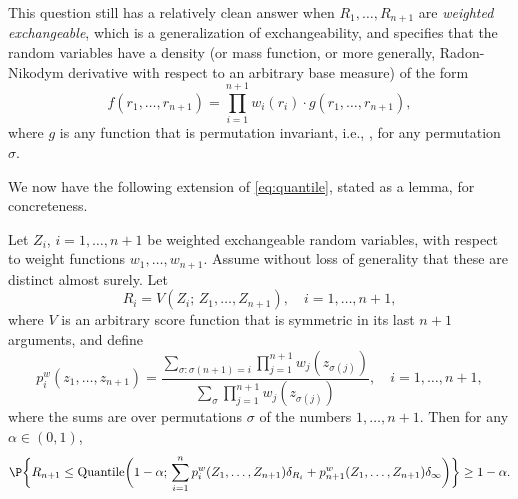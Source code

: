 \documentclass{article}
\begin{document}
This question still has a relatively clean answer when $R_1,\dots,R_{n+1}$ are
\emph{weighted exchangeable}, which is a generalization of exchangeability, and
specifies that the random variables have a density (or mass function, or more
generally, Radon-Nikodym derivative with respect to an arbitrary base measure)
of the form   
\begin{equation}
\label{eq:weighted_exch}
f(r_1,\dots,r_{n+1}) = \prod_{i=1}^{n+1} w_i(r_i) \cdot g(r_1,\dots,r_{n+1}),  
\end{equation}
where $g$ is any function that is permutation invariant, i.e.,
, for
any permutation $\sigma$.

We now have the following extension of \eqref{eq:quantile}, stated as a lemma,
for concreteness.  

\begin{lemma}
\label{lem:weighted_quant}
Let $Z_i$, $i=1,\dots,n+1$ be weighted exchangeable random variables, with
respect to weight functions $w_1,\dots,w_{n+1}$. Assume without loss of
generality that these are distinct almost surely. Let 
\[
R_i = V(Z_i; \, Z_1,\dots,Z_{n+1}), \quad i=1,\dots,n+1, 
\]
where $V$ is an arbitrary score function that is symmetric in its last $n+1$
arguments, and define
\begin{equation}
\label{eq:pw}
p^w_i(z_1,\dots,z_{n+1}) = 
\frac{\sum_{\sigma : \sigma(n+1)=i} \prod_{j=1}^{n+1} w_j(z_{\sigma(j)})}
{\sum_\sigma \prod_{j=1}^{n+1} w_j(z_{\sigma(j)})}, \quad i=1,\dots,n+1,   
\end{equation} 
where the sums are over permutations $\sigma$ of the numbers $1,\dots,n+1$.
Then for any $\alpha \in (0,1)$,  
\begin{equation}
\label{eq:weighted_quant}
\P\bigg\{ R_{n+1} \leq \Quantile\bigg( 1-\alpha; \, \sum_{i=1}^n 
p^w_i(Z_1,\dots,Z_{n+1}) \delta_{R_i} + p^w_{n+1}(Z_1,\dots,Z_{n+1}) 
\delta_\infty \bigg) \bigg\} \geq 1-\alpha.
\end{equation}
\end{lemma}
\end{document}
